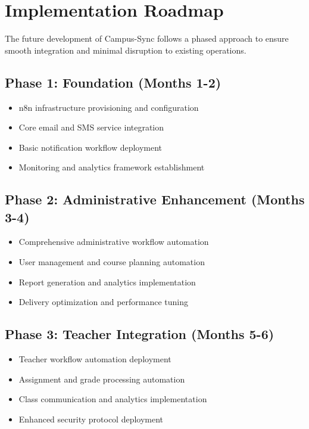 \section{Implementation Roadmap}

The future development of Campus-Sync follows a phased approach to ensure smooth integration and minimal disruption to existing operations.

\subsection{Phase 1: Foundation (Months 1-2)}

\begin{itemize}
    \item n8n infrastructure provisioning and configuration
    \item Core email and SMS service integration
    \item Basic notification workflow deployment
    \item Monitoring and analytics framework establishment
\end{itemize}

\subsection{Phase 2: Administrative Enhancement (Months 3-4)}

\begin{itemize}
    \item Comprehensive administrative workflow automation
    \item User management and course planning automation
    \item Report generation and analytics implementation
    \item Delivery optimization and performance tuning
\end{itemize}

\subsection{Phase 3: Teacher Integration (Months 5-6)}

\begin{itemize}
    \item Teacher workflow automation deployment
    \item Assignment and grade processing automation
    \item Class communication and analytics implementation
    \item Enhanced security protocol deployment
\end{itemize}

